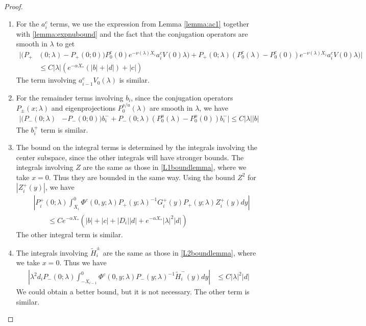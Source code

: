 \documentclass[thesis.tex]{subfiles}
\begin{document}
\begin{lemma}
\begin{proof}
\begin{enumerate}
\item For the $a_i^c$ terms, we use the expression from Lemma \ref{lemma:ac1} together with \cref{lemma:expnubound} and the fact that the conjugation operators are smooth in $\lambda$ to get
\begin{align*}
|(P_+&(0; \lambda) - P_+(0; 0))P_0^c(0) e^{-\nu(\lambda)X_i} a_i^c V(0)
\lambda) + P_+(0; \lambda) (P_0^c(\lambda) - P_0^c(0)) e^{-\nu(\lambda)X_i} a_i^c V(0)
\lambda)| \\
&\leq C |\lambda| \left(  e^{-\alpha X_*} \left( |b| + |d| \right) + |c| \right) 
\end{align*}
The term involving $a_{i-1}^c V_0(\lambda)$ is similar. 

\item For the remainder terms involving $b_i$, since the conjugation operators $P_\pm(x; \lambda)$ and eigenprojections $P_0^{s/u}(\lambda)$ are smooth in $\lambda$, we have
\begin{align*}
|(P_-(0; \lambda) &- P_-(0; 0))b_i^- + P_-(0; \lambda)(P_0^u(\lambda) - P_0^u(0))b_i^-| \leq C |\lambda| |b|
\end{align*}
The $b_i^+$ term is similar.

\item The bound on the integral terms is determined by the integrals involving the center subspace, since the other integrals will have stronger bounds. The integrals involving $Z$ are the same as those in \cref{L1boundlemma}, where we take $x = 0$. Thus they are bounded in the same way. Using the bound $Z^2$ for $| Z_i^+(y)|$, we have 
\begin{align*}
&\left| P_i^+(0; \lambda) \int_{X_i}^0 \Phi^c(0, y; \lambda) P_+(y; \lambda)^{-1} G_i^+(y) P_+(y; \lambda) Z_i^+(y) dy \right| \\
&\qquad \leq C e^{-\alpha X_*} \left(|b| + |c| + |D_i||d| + e^{-\alpha X_*}|\lambda|^2|d|\right)
\end{align*}
The other integral term is similar.

\item The integrals involving $\tilde{H}_i^\pm$ are the same as those in \cref{L2boundlemma}, where we take $x = 0$. Thus we have
\begin{align*}
\left| \lambda^2 d_i P_-(0; \lambda) \int_{-X_{i-1}}^0 \Phi^c(0, y; \lambda) P_-(y; \lambda)^{-1} \tilde{H}_i^-(y) dy \right| &\leq C |\lambda|^2 |d| 
\end{align*}
We could obtain a better bound, but it is not necessary. The other term is similar.


\end{enumerate}
\end{proof}
\end{lemma}
\end{document}
